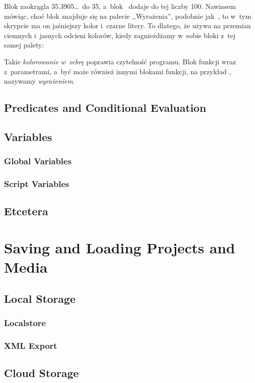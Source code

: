 \documentclass{report}
\begin{document}
Blok  zaokrągla 35.3905\ldots\ do 35, a~blok~\code{+} dodaje do tej liczby 100. Nawiasem mówiąc, choć blok  znajduje się na palecie ,,Wyrażenia'', podobnie jak~\code{+}, to w~tym skrypcie ma on jaśniejszy kolor i~czarne litery. To dlatego, że \Snap{} używa na przemian ciemnych i~jasnych odcieni kolorów, kiedy zagnieżdżamy w~sobie bloki z~tej samej palety:


Takie \emph{kolorowanie w~zebrę} poprawia czytelność programu. Blok funkcji wraz z~parametrami, a~być może również innymi blokami funkcji, na przykład , nazywamy \emph{wyrażeniem}.

\section{Predicates and Conditional Evaluation}
\section{Variables}
\subsection{Global Variables}
\subsection{Script Variables}
\section{Etcetera}
\chapter{Saving and Loading Projects and Media}
\section{Local Storage}
\subsection{Localstore}
\subsection{XML Export}
\section{Cloud Storage}
\end{document}
